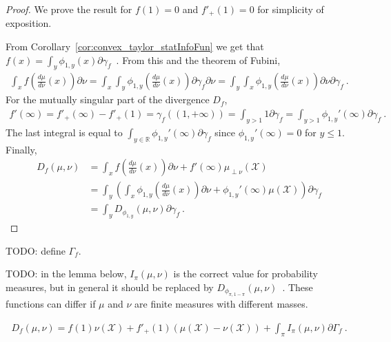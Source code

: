 \begin{proof}\leanok
{}
We prove the result for $f(1) = 0$ and $f'_+(1) = 0$ for simplicity of exposition.

From Corollary~\ref{cor:convex_taylor_statInfoFun} we get that $f(x) = \int_y \phi_{1,y}(x) \partial\gamma_f$~.
From this and the theorem of Fubini,
\begin{align*}
\int_x f\left( \frac{d \mu}{d \nu}(x) \right) \partial\nu
= \int_{x} \int_{y} \phi_{1,y} \left(\frac{d \mu}{d \nu}(x) \right) \partial\gamma_f \partial\nu
= \int_{y} \int_{x} \phi_{1,y} \left(\frac{d \mu}{d \nu}(x) \right) \partial\nu \partial\gamma_f
\: .
\end{align*}
For the mutually singular part of the divergence $D_f$,
\begin{align*}
f'(\infty)
= f'_+(\infty) - f'_+(1) 
= \gamma_f((1,+\infty))
= \int_{y > 1} 1 \partial \gamma_f
= \int_{y > 1} \phi_{1,y}'(\infty) \partial \gamma_f
\: .
\end{align*}
The last integral is equal to $\int_{y \in \mathbb{R}} \phi_{1,y}'(\infty) \partial \gamma_f$ since $\phi_{1,y}'(\infty) = 0$ for $y \le 1$.
Finally,
\begin{align*}
D_f(\mu, \nu)
&= \int_x f\left( \frac{d \mu}{d \nu}(x) \right) \partial\nu + f'(\infty) \mu_{\perp \nu}(\mathcal X)
\\
&= \int_{y} \left(\int_{x} \phi_{1,y} \left(\frac{d \mu}{d \nu}(x) \right) \partial\nu + \phi_{1,y}'(\infty) \mu(\mathcal X) \right) \partial\gamma_f
\\
&= \int_y D_{\phi_{1,y}}(\mu, \nu) \partial \gamma_f
\: .
\end{align*}
\end{proof}

TODO: define $\Gamma_f$.

TODO: in the lemma below, $I_\pi(\mu, \nu)$ is the correct value for probability measures, but in general it should be replaced by $D_{\phi_{\pi, 1 - \pi}}(\mu, \nu)$~.
These functions can differ if $\mu$ and $\nu$ are finite measures with different masses.

\begin{theorem}
  \label{thm:fDiv_eq_integral}
  \begin{align*}
  D_f(\mu, \nu) = f(1) \nu(\mathcal X) + f'_+(1)(\mu(\mathcal X) - \nu(\mathcal X)) + \int_\pi I_\pi(\mu, \nu) \partial\Gamma_f \: .
  \end{align*}
  
\end{theorem}

